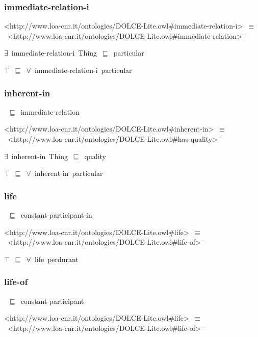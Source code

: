 \documentclass{article}
\begin{document}
\subsubsection*{immediate-relation-i}

<http://www.loa-cnr.it/ontologies/DOLCE-Lite.owl#immediate-relation-i>~\ensuremath{\equiv}~<http://www.loa-cnr.it/ontologies/DOLCE-Lite.owl#immediate-relation>\ensuremath{^-}

\ensuremath{\exists}~immediate-relation-i~Thing~\ensuremath{\sqsubseteq}~particular

\ensuremath{\top}~\ensuremath{\sqsubseteq}~\ensuremath{\forall}~immediate-relation-i~particular

\subsubsection*{inherent-in}

~\ensuremath{\sqsubseteq}~immediate-relation

<http://www.loa-cnr.it/ontologies/DOLCE-Lite.owl#inherent-in>~\ensuremath{\equiv}~<http://www.loa-cnr.it/ontologies/DOLCE-Lite.owl#has-quality>\ensuremath{^-}

\ensuremath{\exists}~inherent-in~Thing~\ensuremath{\sqsubseteq}~quality

\ensuremath{\top}~\ensuremath{\sqsubseteq}~\ensuremath{\forall}~inherent-in~particular

\subsubsection*{life}

~\ensuremath{\sqsubseteq}~constant-participant-in

<http://www.loa-cnr.it/ontologies/DOLCE-Lite.owl#life>~\ensuremath{\equiv}~<http://www.loa-cnr.it/ontologies/DOLCE-Lite.owl#life-of>\ensuremath{^-}

\ensuremath{\top}~\ensuremath{\sqsubseteq}~\ensuremath{\forall}~life~perdurant

\subsubsection*{life-of}

~\ensuremath{\sqsubseteq}~constant-participant

<http://www.loa-cnr.it/ontologies/DOLCE-Lite.owl#life>~\ensuremath{\equiv}~<http://www.loa-cnr.it/ontologies/DOLCE-Lite.owl#life-of>\ensuremath{^-}
\end{document}
